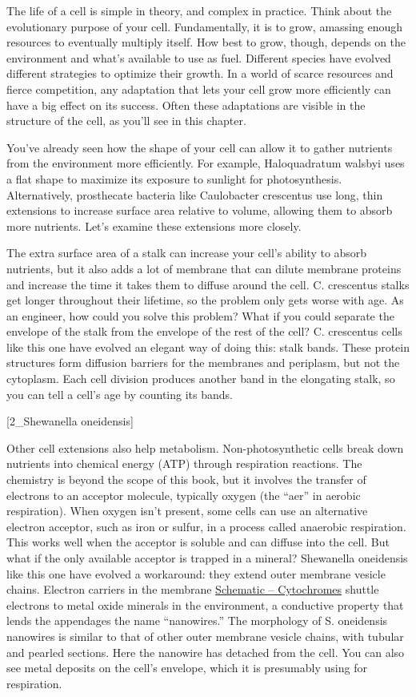 \documentclass[]{tufte-book}
\begin{document}
The life of a cell is simple in theory, and complex in practice. Think
about the evolutionary purpose of your cell. Fundamentally, it is to
grow, amassing enough resources to eventually multiply itself. How best
to grow, though, depends on the environment and what's available to use
as fuel. Different species have evolved different strategies to optimize
their growth. In a world of scarce resources and fierce competition, any
adaptation that lets your cell grow more efficiently can have a big
effect on its success. Often these adaptations are visible in the
structure of the cell, as you'll see in this chapter.

You've already seen how the shape of your cell can allow it to gather
nutrients from the environment more efficiently. For example,
Haloquadratum walsbyi uses a flat shape to maximize its exposure to
sunlight for photosynthesis. Alternatively, prosthecate bacteria like
Caulobacter crescentus use long, thin extensions to increase surface
area relative to volume, allowing them to absorb more nutrients. Let's
examine these extensions more closely.

The extra surface area of a stalk can increase your cell's ability to
absorb nutrients, but it also adds a lot of membrane that can dilute
membrane proteins and increase the time it takes them to diffuse around
the cell. C. crescentus stalks get longer throughout their lifetime, so
the problem only gets worse with age. As an engineer, how could you
solve this problem? What if you could separate the envelope of the stalk
from the envelope of the rest of the cell? C. crescentus cells like this
one have evolved an elegant way of doing this: stalk bands. These
protein structures form diffusion barriers for the membranes and
periplasm, but not the cytoplasm. Each cell division produces another
band in the elongating stalk, so you can tell a cell's age by counting
its bands.

{[}2\_Shewanella oneidensis{]}

Other cell extensions also help metabolism. Non-photosynthetic cells
break down nutrients into chemical energy (ATP) through respiration
reactions. The chemistry is beyond the scope of this book, but it
involves the transfer of electrons to an acceptor molecule, typically
oxygen (the ``aer'' in aerobic respiration). When oxygen isn't present,
some cells can use an alternative electron acceptor, such as iron or
sulfur, in a process called anaerobic respiration. This works well when
the acceptor is soluble and can diffuse into the cell. But what if the
only available acceptor is trapped in a mineral? Shewanella oneidensis
like this one have evolved a workaround: they extend outer membrane
vesicle chains. Electron carriers in the membrane
\protect\hyperlink{Cytochromes}{Schematic -- Cytochromes} shuttle
electrons to metal oxide minerals in the environment, a conductive
property that lends the appendages the name ``nanowires.'' The
morphology of S. oneidensis nanowires is similar to that of other outer
membrane vesicle chains, with tubular and pearled sections. Here the
nanowire has detached from the cell. You can also see metal deposits on
the cell's envelope, which it is presumably using for respiration.
\end{document}
